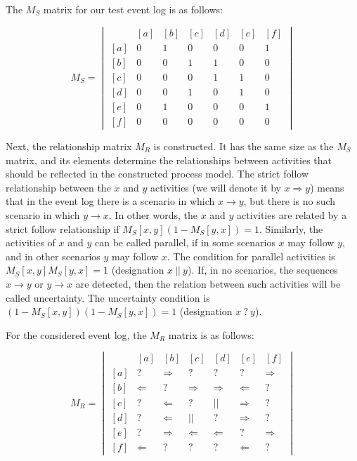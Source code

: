 \documentclass[
11pt,%
tightenlines,%
twoside,%
onecolumn,%
nofloats,%
nobibnotes,%
nofootinbib,%
superscriptaddress,%
noshowpacs,%
centertags]%
{revtex4}
\begin{document}
The $M_S$ matrix for our test event log is as follows:

\begin{equation}
M_S = \begin{vmatrix}
\ & [a] & [b] & [c] & [d] & [e] & [f] \\
[a] & 0 & 1 & 0 & 0 & 0 & 1 \\ 
[b] & 0 & 0 & 1 & 1 & 0 & 0 \\
[c] & 0 & 0 & 0 & 1 & 1 & 0 \\
[d] & 0 & 0 & 1 & 0 & 1 & 0 \\
[e] & 0 & 1 & 0 & 0 & 0 & 1 \\
[f] & 0 & 0 & 0 & 0 & 0 & 0
\end{vmatrix}
\end{equation}

Next, the relationship matrix $M_R$ is constructed.
It has the same size as the $M_S$ matrix, and its elements determine the relationships between activities that should be reflected in the constructed process model.
The strict follow relationship between the $x$ and $y$ activities (we will denote it by $x \Rightarrow y$) means that in the event log there is a scenario in which $x \rightarrow y$, but there is no such scenario in which $y \rightarrow x$.
In other words, the $x$ and $y$ activities are related by a strict follow relationship if $M_S[x, y](1 - M_S[y, x]) = 1$.
Similarly, the activities of $x$ and $y$ can be called parallel, if in some scenarios $x$ may follow $y$, and in other scenarios $y$ may follow $x$.
The condition for parallel activities is $M_S[x, y]M_S[y, x] = 1$ (designation $x \ || \ y$).
If, in no scenarios, the sequences $x \rightarrow y$ or $y \rightarrow x$ are detected, then the relation between such activities will be called uncertainty.
The uncertainty condition is $(1 - M_S[x, y])(1 - M_S[y, x]) = 1$ (designation $x \ ? \ y$).

For the considered event log, the $M_R$ matrix is as follows:

\begin{equation}\label{eqn:r}
M_R = \begin{vmatrix}
\ & [a] & [b] & [c] & [d] & [e] & [f] \\
[a] & ? & \Rightarrow & ? & ? & ? & \Rightarrow \\ 
[b] & \Leftarrow & ? & \Rightarrow & \Rightarrow & \Leftarrow & ? \\
[c] & ? & \Leftarrow & ? & || & \Rightarrow & ? \\
[d] & ? & \Leftarrow & || & ? & \Rightarrow & ? \\
[e] & ? & \Rightarrow & \Leftarrow & \Leftarrow & ? & \Rightarrow \\
[f] & \Leftarrow & ? & ? & ? & \Leftarrow & ?
\end{vmatrix}
\end{equation}
\end{document}

